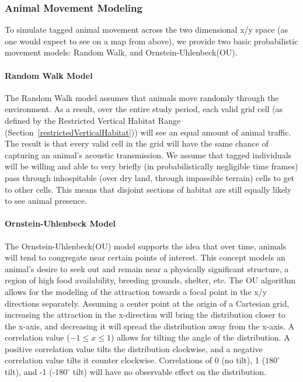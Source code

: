 \subsubsection{Animal Movement Modeling}
\label{animalMovementModel}
To simulate tagged animal movement across the two dimensional x/y space (as one would expect to see on a map from above), we provide two basic probabilistic movement models: Random Walk, and Ornstein-Uhlenbeck(OU).  

\paragraph{Random Walk Model}
\label{randomWalkModel}
The Random Walk model assumes that animals move randomly through the environment.  As a result, over the entire study period, each valid grid cell (as defined by the Restricted Vertical Habitat Range (Section~\ref{restrictedVerticalHabitat})) will see an equal amount of animal traffic.  The result is that every valid cell  in the grid will have the same chance of capturing an animal's acoustic transmission.  We assume that tagged individuals will be willing and able to very briefly (in probabilistically negligible time frames) pass through inhospitable (over dry land, through impassible terrain) cells to get to other cells.  This means that disjoint sections of habitat are still equally likely to see animal presence.

\paragraph{Ornstein-Uhlenbeck Model}
\label{ouModel}
The Ornstein-Uhlenbeck(OU) model\cite{OU} supports the idea that over time, animals will tend to congregate near certain points of interest.  This concept models an animal's desire to seek out and remain near a physically significant structure, a region of high food availability, breeding grounds, shelter, etc.  The OU algorithm allows for the modeling of the attraction towards a focal point in the x/y directions separately.  Assuming a center point at the origin of a Cartesian grid, increasing the attraction in the x-direction will bring the distribution closer to the x-axis, and decreasing it will spread the distribution away from the x-axis.  A correlation value ($-1\le x \le 1$) allows for tilting the angle of the distribution.  A positive correlation value tilts the distribution clockwise, and a negative correlation value tilts it counter clockwise.  Correlations of 0 (no tilt), 1 ($180^{\circ}$ tilt), and -1 (-$180^{\circ}$ tilt) will have no observable effect on the distribution.


